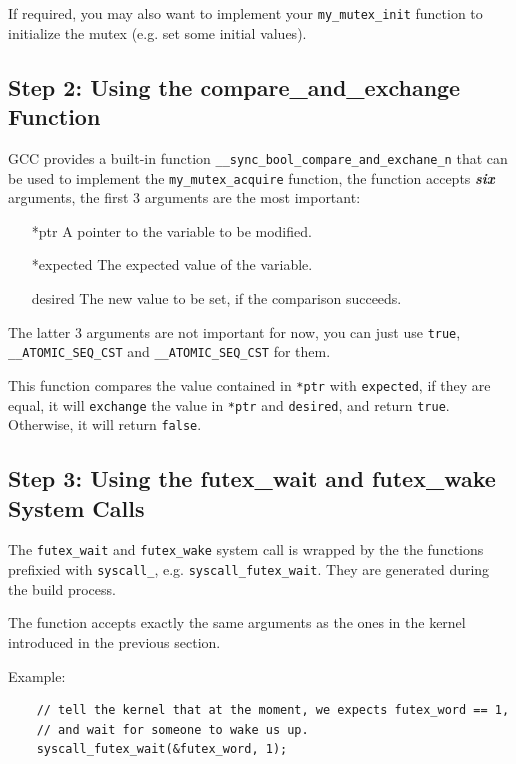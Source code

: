 If required, you may also want to implement your \texttt{my\_mutex\_init} function to initialize
the mutex (e.g. set some initial values).

\subsection{Step 2: Using the compare\_and\_exchange Function}

GCC provides a built-in function \texttt{\_\_sync\_bool\_compare\_and\_exchane\_n} that
can be used to implement the \texttt{my\_mutex\_acquire} function, the function accepts
\textit{\textbf{six}} arguments, the first 3 arguments are the most important:

\begin{itemize}
    \item[*ptr] A pointer to the variable to be modified.
    \item[*expected] The expected value of the variable.
    \item[desired] The new value to be set, if the comparison succeeds.
\end{itemize}

The latter 3 arguments are not important for now, you can just use \texttt{true},
\texttt{\_\_ATOMIC\_SEQ\_CST} and \texttt{\_\_ATOMIC\_SEQ\_CST} for them.

This function compares the value contained in \texttt{*ptr} with \texttt{expected}, if they
are equal, it will \texttt{exchange} the value in \texttt{*ptr} and \texttt{desired}, and
return \texttt{true}. Otherwise, it will return \texttt{false}.

\subsection{Step 3: Using the futex\_wait and futex\_wake System Calls}

The \texttt{futex\_wait} and \texttt{futex\_wake} system call is wrapped by the
the functions prefixied with \texttt{syscall\_}, e.g. \texttt{syscall\_futex\_wait}.
They are generated during the build process.

The function accepts exactly the same arguments as the ones in the kernel introduced
in the previous section.

Example:

\begin{verbatim}
    // tell the kernel that at the moment, we expects futex_word == 1,
    // and wait for someone to wake us up.
    syscall_futex_wait(&futex_word, 1);
\end{verbatim}

